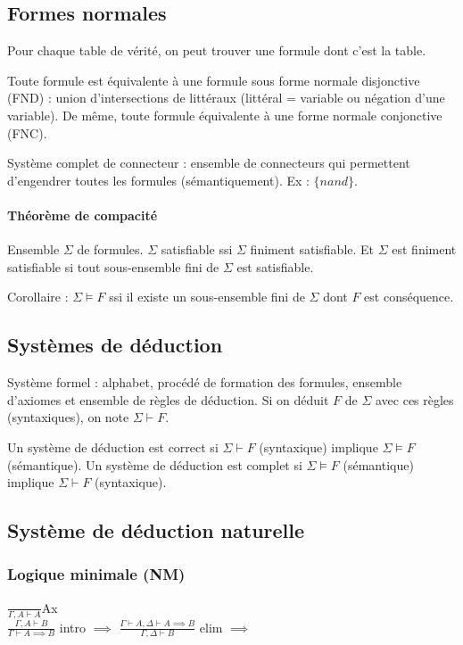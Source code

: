 \documentclass[french]{article}
\begin{document}
\subsection{Formes normales}
Pour chaque table de vérité, on peut trouver une formule dont c'est la table.

Toute formule est équivalente à une formule sous forme normale disjonctive (FND) : union d'intersections de littéraux (littéral = variable ou négation d'une variable). De même, toute formule équivalente à une forme normale conjonctive (FNC).

Système complet de connecteur : ensemble de connecteurs qui permettent d'engendrer toutes les formules (sémantiquement). Ex : $\{nand\}$.

\paragraph{Théorème de compacité}
Ensemble $\Sigma$ de formules. $\Sigma$ satisfiable ssi $\Sigma$ finiment satisfiable. Et $\Sigma$ est finiment satisfiable si tout sous-ensemble fini de $\Sigma$ est satisfiable.

Corollaire : $\Sigma\models F$ ssi il existe un sous-ensemble fini de $\Sigma$ dont $F$ est conséquence.

\subsection{Systèmes de déduction}
Système formel : alphabet, procédé de formation des formules, ensemble d'axiomes et ensemble de règles de déduction. Si on déduit $F$ de $\Sigma$ avec ces règles (syntaxiques), on note $\Sigma\vdash F$.

Un système de déduction est correct si $\Sigma\vdash F$ (syntaxique) implique $\Sigma\models F$ (sémantique).
Un système de déduction est complet si  $\Sigma\models F$ (sémantique) implique  $\Sigma\vdash F$ (syntaxique).

\subsection{Système de déduction naturelle}
\subsubsection{Logique minimale (NM)}
$\frac{}{\Gamma,A\vdash A}$Ax\\

$\frac{\Gamma ,A\vdash B}{\Gamma\vdash A\implies B}$ intro $\implies$ 
$\frac{\Gamma\vdash A, \Delta\vdash A\implies B}{\Gamma ,\Delta\vdash B}$ elim $\implies$\\
\end{document}
